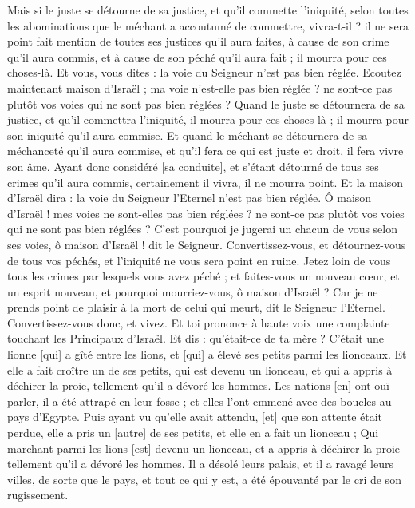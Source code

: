 \begin{multicols}{2}
Mais si le juste se détourne de sa justice, et qu'il commette l'iniquité, selon toutes les abominations que le méchant a accoutumé de commettre, vivra-t-il ? il ne sera point fait mention de toutes ses justices qu'il aura faites, à cause de son crime qu'il aura commis, et à cause de son péché qu'il aura fait ; il mourra pour ces choses-là.
Et vous, vous dites : la voie du Seigneur n'est pas bien réglée. Ecoutez maintenant maison d'Israël ; ma voie n'est-elle pas bien réglée ? ne sont-ce pas plutôt vos voies qui ne sont pas bien réglées ?
Quand le juste se détournera de sa justice, et qu'il commettra l'iniquité, il mourra pour ces choses-là ; il mourra pour son iniquité qu'il aura commise.
Et quand le méchant se détournera de sa méchanceté qu'il aura commise, et qu'il fera ce qui est juste et droit, il fera vivre son âme.
Ayant donc considéré [sa conduite], et s'étant détourné de tous ses crimes qu'il aura commis, certainement il vivra, il ne mourra point.
Et la maison d'Israël dira : la voie du Seigneur l'Eternel n'est pas bien réglée. Ô maison d'Israël ! mes voies ne sont-elles pas bien réglées ? ne sont-ce pas plutôt vos voies qui ne sont pas bien réglées ?
C'est pourquoi je jugerai un chacun de vous selon ses voies, ô maison d'Israël ! dit le Seigneur. Convertissez-vous, et détournez-vous de tous vos péchés, et l'iniquité ne vous sera point en ruine.
Jetez loin de vous tous les crimes par lesquels vous avez péché ; et faites-vous un nouveau cœur, et un esprit nouveau, et pourquoi mourriez-vous, ô maison d'Israël ?
Car je ne prends point de plaisir à la mort de celui qui meurt, dit le Seigneur l'Eternel. Convertissez-vous donc, et vivez.
\VerseOne{}Et toi prononce à haute voix une complainte touchant les Principaux d'Israël.
Et dis : qu'était-ce de ta mère ? C'était une lionne [qui] a gîté entre les lions, et [qui] a élevé ses petits parmi les lionceaux.
Et elle a fait croître un de ses petits, qui est devenu un lionceau, et qui a appris à déchirer la proie, tellement qu'il a dévoré les hommes.
Les nations [en] ont ouï parler, il a été attrapé en leur fosse ; et elles l'ont emmené avec des boucles au pays d'Egypte.
Puis ayant vu qu'elle avait attendu, [et] que son attente était perdue, elle a pris un [autre] de ses petits, et elle en a fait un lionceau ;
Qui marchant parmi les lions [est] devenu un lionceau, et a appris à déchirer la proie tellement qu'il a dévoré les hommes.
Il a désolé leurs palais, et il a ravagé leurs villes, de sorte que le pays, et tout ce qui y est, a été épouvanté par le cri de son rugissement.

\end{multicols}
